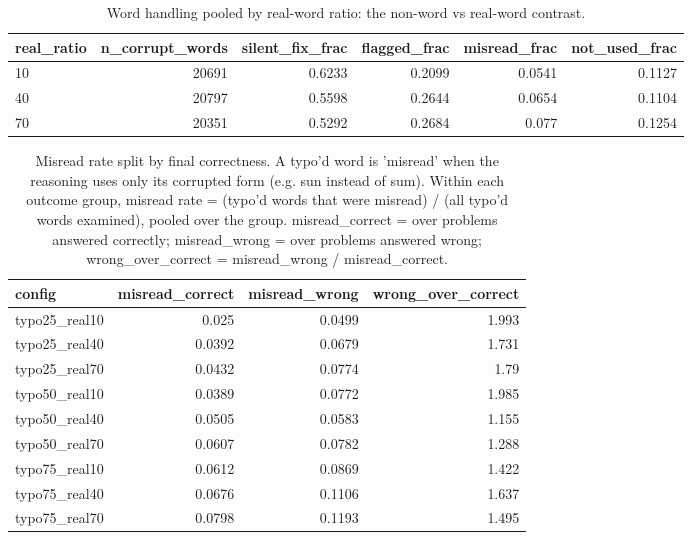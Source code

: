 \documentclass[11pt]{article}
\begin{document}
\begin{table}[H]
\centering
\caption{Word handling pooled by real-word ratio: the non-word vs real-word contrast.}
\small
\begin{adjustbox}{max width=\textwidth}
\begin{tabular}{lrrrrr}
\toprule
\textbf{real\_ratio} & \textbf{n\_corrupt\_words} & \textbf{silent\_fix\_frac} & \textbf{flagged\_frac} & \textbf{misread\_frac} & \textbf{not\_used\_frac} \\
\midrule
10 & 20691 & 0.6233 & 0.2099 & 0.0541 & 0.1127 \\
40 & 20797 & 0.5598 & 0.2644 & 0.0654 & 0.1104 \\
70 & 20351 & 0.5292 & 0.2684 & 0.077 & 0.1254 \\
\bottomrule
\end{tabular}
\end{adjustbox}
\end{table}

\begin{table}[H]
\centering
\caption{Misread rate split by final correctness. A typo'd word is 'misread' when the reasoning uses only its corrupted form (e.g. sun instead of sum). Within each outcome group, misread rate = (typo'd words that were misread) / (all typo'd words examined), pooled over the group. misread\_correct = over problems answered correctly; misread\_wrong = over problems answered wrong; wrong\_over\_correct = misread\_wrong / misread\_correct.}
\small
\begin{adjustbox}{max width=\textwidth}
\begin{tabular}{lrrr}
\toprule
\textbf{config} & \textbf{misread\_correct} & \textbf{misread\_wrong} & \textbf{wrong\_over\_correct} \\
\midrule
typo25\_real10 & 0.025 & 0.0499 & 1.993 \\
typo25\_real40 & 0.0392 & 0.0679 & 1.731 \\
typo25\_real70 & 0.0432 & 0.0774 & 1.79 \\
typo50\_real10 & 0.0389 & 0.0772 & 1.985 \\
typo50\_real40 & 0.0505 & 0.0583 & 1.155 \\
typo50\_real70 & 0.0607 & 0.0782 & 1.288 \\
typo75\_real10 & 0.0612 & 0.0869 & 1.422 \\
typo75\_real40 & 0.0676 & 0.1106 & 1.637 \\
typo75\_real70 & 0.0798 & 0.1193 & 1.495 \\
\bottomrule
\end{tabular}
\end{adjustbox}
\end{table}
\end{document}
